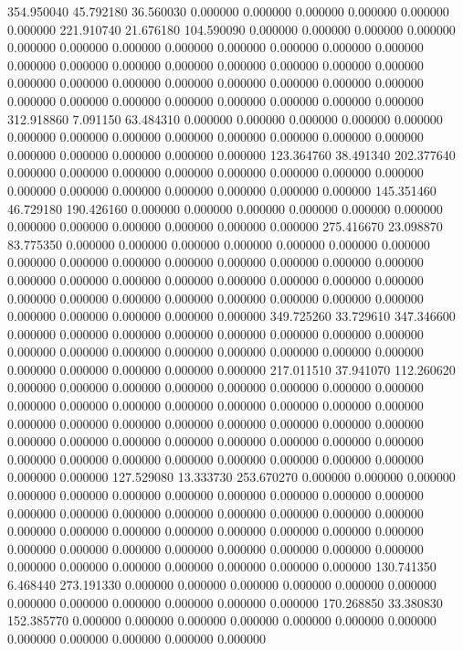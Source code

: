 354.950040 45.792180 36.560030
0.000000 0.000000 0.000000
0.000000 0.000000 0.000000
221.910740 21.676180 104.590090
0.000000 0.000000 0.000000
0.000000 0.000000 0.000000
0.000000 0.000000 0.000000
0.000000 0.000000 0.000000
0.000000 0.000000 0.000000
0.000000 0.000000 0.000000
0.000000 0.000000 0.000000
0.000000 0.000000 0.000000
0.000000 0.000000 0.000000
0.000000 0.000000 0.000000
0.000000 0.000000 0.000000
0.000000 0.000000 0.000000
312.918860 7.091150 63.484310
0.000000 0.000000 0.000000
0.000000 0.000000 0.000000
0.000000 0.000000 0.000000
0.000000 0.000000 0.000000
0.000000 0.000000 0.000000
0.000000 0.000000 0.000000
123.364760 38.491340 202.377640
0.000000 0.000000 0.000000
0.000000 0.000000 0.000000
0.000000 0.000000 0.000000
0.000000 0.000000 0.000000
0.000000 0.000000 0.000000
145.351460 46.729180 190.426160
0.000000 0.000000 0.000000
0.000000 0.000000 0.000000
0.000000 0.000000 0.000000
0.000000 0.000000 0.000000
275.416670 23.098870 83.775350
0.000000 0.000000 0.000000
0.000000 0.000000 0.000000
0.000000 0.000000 0.000000
0.000000 0.000000 0.000000
0.000000 0.000000 0.000000
0.000000 0.000000 0.000000
0.000000 0.000000 0.000000
0.000000 0.000000 0.000000
0.000000 0.000000 0.000000
0.000000 0.000000 0.000000
0.000000 0.000000 0.000000
0.000000 0.000000 0.000000
349.725260 33.729610 347.346600
0.000000 0.000000 0.000000
0.000000 0.000000 0.000000
0.000000 0.000000 0.000000
0.000000 0.000000 0.000000
0.000000 0.000000 0.000000
0.000000 0.000000 0.000000
0.000000 0.000000 0.000000
217.011510 37.941070 112.260620
0.000000 0.000000 0.000000
0.000000 0.000000 0.000000
0.000000 0.000000 0.000000
0.000000 0.000000 0.000000
0.000000 0.000000 0.000000
0.000000 0.000000 0.000000
0.000000 0.000000 0.000000
0.000000 0.000000 0.000000
0.000000 0.000000 0.000000
0.000000 0.000000 0.000000
0.000000 0.000000 0.000000
0.000000 0.000000 0.000000
0.000000 0.000000 0.000000
0.000000 0.000000 0.000000
127.529080 13.333730 253.670270
0.000000 0.000000 0.000000
0.000000 0.000000 0.000000
0.000000 0.000000 0.000000
0.000000 0.000000 0.000000
0.000000 0.000000 0.000000
0.000000 0.000000 0.000000
0.000000 0.000000 0.000000
0.000000 0.000000 0.000000
0.000000 0.000000 0.000000
0.000000 0.000000 0.000000
0.000000 0.000000 0.000000
0.000000 0.000000 0.000000
0.000000 0.000000 0.000000
0.000000 0.000000 0.000000
130.741350 6.468440 273.191330
0.000000 0.000000 0.000000
0.000000 0.000000 0.000000
0.000000 0.000000 0.000000
0.000000 0.000000 0.000000
170.268850 33.380830 152.385770
0.000000 0.000000 0.000000
0.000000 0.000000 0.000000
0.000000 0.000000 0.000000
0.000000 0.000000 0.000000
